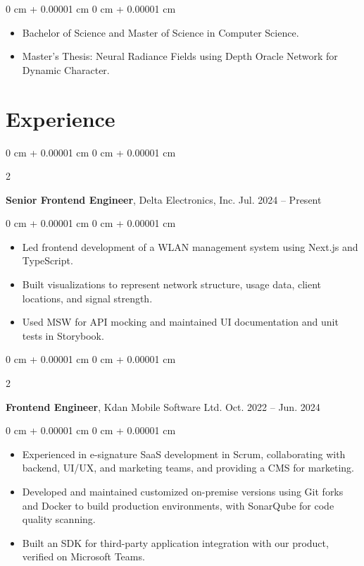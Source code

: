\documentclass[10pt, letterpaper]{article}
\newenvironment{highlights}{
    \begin{itemize}[
        topsep=0.10 cm,
        parsep=0.10 cm,
        partopsep=0pt,
        itemsep=0pt,
        leftmargin=0 cm + 10pt
    ]
}{
    \end{itemize}
} %
\newenvironment{onecolentry}{
    \begin{adjustwidth}{
        0 cm + 0.00001 cm
    }{
        0 cm + 0.00001 cm
    }
}{
    \end{adjustwidth}
} %
\newenvironment{twocolentry}[2][]{
    \onecolentry
    \def\secondColumn{#2}
    \setcolumnwidth{\fill, 4.5 cm}
    \begin{paracol}{2}
}{
    \switchcolumn \raggedleft \secondColumn
    \end{paracol}
    \endonecolentry
} %
\begin{document}
        \vspace{0.10 cm}
        \begin{onecolentry}
            \begin{highlights}
                \item Bachelor of Science and Master of Science in Computer Science.
                \item Master’s Thesis: Neural Radiance Fields using Depth Oracle Network for Dynamic Character.
            \end{highlights}
        \end{onecolentry}
    
    \section{Experience}

        \begin{twocolentry}{
            Jul. 2024 – Present
        }
            \textbf{Senior Frontend Engineer}, Delta Electronics, Inc.\end{twocolentry}

        \vspace{0.10 cm}
        \begin{onecolentry}
            \begin{highlights}
                \item Led frontend development of a WLAN management system using Next.js and TypeScript.
                \item Built visualizations to represent network structure, usage data, client locations, and signal strength.
                \item Used MSW for API mocking and maintained UI documentation and unit tests in Storybook.
            \end{highlights}
        \end{onecolentry}


        \vspace{0.2 cm}

        \begin{twocolentry}{
            Oct. 2022 – Jun. 2024
        }
            \textbf{Frontend Engineer}, Kdan Mobile Software Ltd.\end{twocolentry}

        \vspace{0.10 cm}
        \begin{onecolentry}
            \begin{highlights}
                \item Experienced in e-signature SaaS development in Scrum, collaborating with backend, UI/UX, and marketing teams, and providing a CMS for marketing.
                \item Developed and maintained customized on-premise versions using Git forks and Docker to build production environments, with SonarQube for code quality scanning.
                \item Built an SDK for third-party application integration with our product, verified on Microsoft Teams.
            \end{highlights}
        \end{onecolentry}
\end{document}
